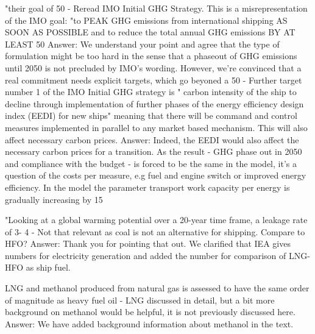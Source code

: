"their goal of 50%
-	Reread IMO Initial GHG Strategy. This is a misrepresentation of the IMO goal: "to PEAK GHG emissions from international shipping AS SOON AS POSSIBLE and to reduce the total annual GHG emissions BY AT LEAST 50%
Answer: We understand your point and agree that the type of formulation might be too hard in the sense that a phaseout of GHG emissions until 2050 is not precluded by IMO's wording. However, we're convinced that a real commitment needs explicit targets, which go beyoned a 50%
-	Further target number 1 of the IMO Initial GHG strategy is " carbon intensity of the ship to decline through implementation of further phases of the energy efficiency design index (EEDI) for new ships" meaning that there will be command and control measures implemented in parallel to any market based mechanism. This will also affect necessary carbon prices.
Answer: Indeed, the EEDI would also affect the necessary carbon prices for a transition. As the result - GHG phase out in 2050 and compliance with the budget - is forced to be the same in the model, it's a question of the costs per measure, e.g fuel and engine switch or improved energy efficiency. In the model the parameter transport work capacity per energy is gradually increasing by 15%

"Looking at a global warming potential over a 20-year time frame, a leakage rate of 3- 4 %
-	Not that relevant as coal is not an alternative for shipping. Compare to HFO?
Answer: Thank you for pointing that out. We clarified that IEA gives numbers for electricity generation and added the number for comparison of LNG-HFO as ship fuel.

LNG and methanol produced from natural gas is assessed to have the same order of magnitude as heavy fuel oil
-	LNG discussed in detail, but a bit more background on methanol would be helpful, it is not previously discussed here.
Answer: We have added background information about methanol in the text.

